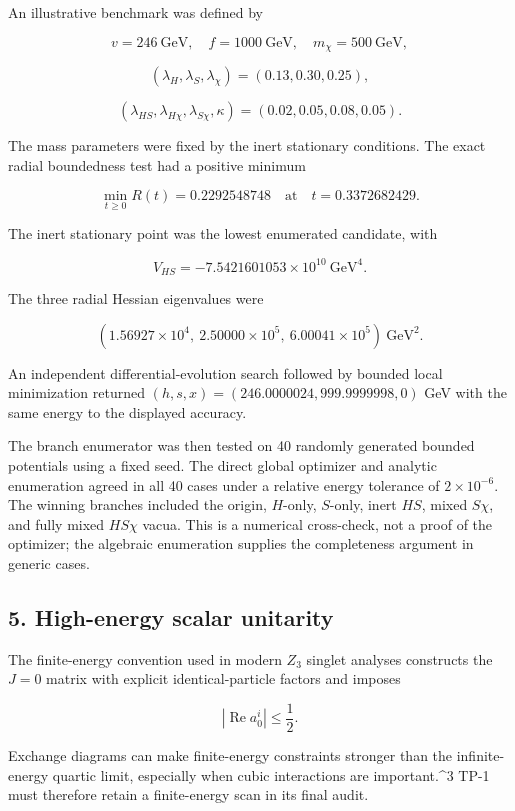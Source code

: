 \documentclass[
]{article}
\begin{document}
An illustrative benchmark was defined by

\[
v=246\ \mathrm{GeV},\quad f=1000\ \mathrm{GeV},\quad
m_\chi=500\ \mathrm{GeV},
\]

\[
(\lambda_H,\lambda_S,\lambda_\chi)=(0.13,0.30,0.25),
\]

\[
(\lambda_{HS},\lambda_{H\chi},\lambda_{S\chi},\kappa)
=(0.02,0.05,0.08,0.05).
\]

The mass parameters were fixed by the inert stationary conditions. The
exact radial boundedness test had a positive minimum

\[
\min_{t\ge0}R(t)=0.2292548748
\quad\text{at}\quad t=0.3372682429.
\]

The inert stationary point was the lowest enumerated candidate, with

\[
V_{HS}=-7.5421601053\times10^{10}\ \mathrm{GeV}^4.
\]

The three radial Hessian eigenvalues were

\[
(1.56927\times10^4,\ 2.50000\times10^5,\ 6.00041\times10^5)\ \mathrm{GeV}^2.
\]

An independent differential-evolution search followed by bounded local
minimization returned \((h,s,x)=(246.0000024,999.9999998,0)\) GeV with
the same energy to the displayed accuracy.

The branch enumerator was then tested on 40 randomly generated bounded
potentials using a fixed seed. The direct global optimizer and analytic
enumeration agreed in all 40 cases under a relative energy tolerance of
\(2\times10^{-6}\). The winning branches included the origin,
\(H\)-only, \(S\)-only, inert \(HS\), mixed \(S\chi\), and fully mixed
\(HS\chi\) vacua. This is a numerical cross-check, not a proof of the
optimizer; the algebraic enumeration supplies the completeness argument
in generic cases.

\hypertarget{high-energy-scalar-unitarity}{%
\subsection{5. High-energy scalar
unitarity}\label{high-energy-scalar-unitarity}}

The finite-energy convention used in modern \(Z_3\) singlet analyses
constructs the \(J=0\) matrix with explicit identical-particle factors
and imposes

\[
\left|\operatorname{Re}a_0^i\right|\le\frac12.
\]

Exchange diagrams can make finite-energy constraints stronger than the
infinite-energy quartic limit, especially when cubic interactions are
important.\^{}3 TP-1 must therefore retain a finite-energy scan in its
final audit.
\end{document}
